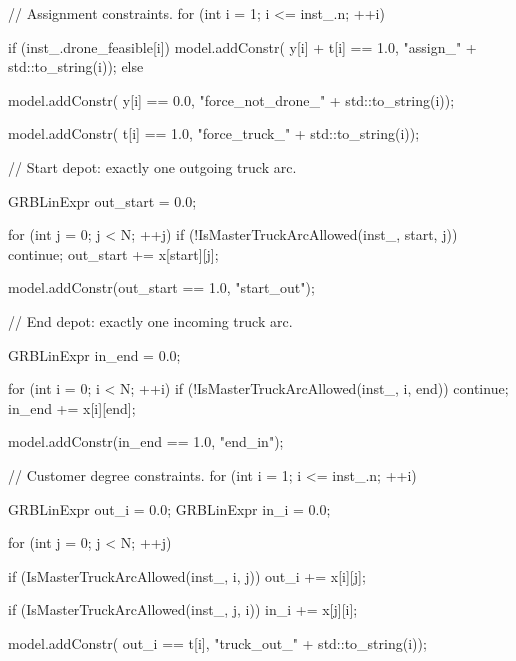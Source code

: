 {{{            // Assignment constraints.
            for (int i = 1; i <= inst_.n; ++i)
            {
                if (inst_.drone_feasible[i])
                {
                    model.addConstr(
                        y[i] + t[i] == 1.0,
                        "assign_" + std::to_string(i));
                }
                else
                {
                    model.addConstr(
                        y[i] == 0.0,
                        "force_not_drone_" + std::to_string(i));

                    model.addConstr(
                        t[i] == 1.0,
                        "force_truck_" + std::to_string(i));
                }
            }

            // Start depot: exactly one outgoing truck arc.
            {
                GRBLinExpr out_start = 0.0;

                for (int j = 0; j < N; ++j)
                {
                    if (!IsMasterTruckArcAllowed(inst_, start, j))
                        continue;
                    out_start += x[start][j];
                }

                model.addConstr(out_start == 1.0, "start_out");
            }

            // End depot: exactly one incoming truck arc.
            {
                GRBLinExpr in_end = 0.0;

                for (int i = 0; i < N; ++i)
                {
                    if (!IsMasterTruckArcAllowed(inst_, i, end))
                        continue;
                    in_end += x[i][end];
                }

                model.addConstr(in_end == 1.0, "end_in");
            }

            // Customer degree constraints.
            for (int i = 1; i <= inst_.n; ++i)
            {
                GRBLinExpr out_i = 0.0;
                GRBLinExpr in_i = 0.0;

                for (int j = 0; j < N; ++j)
                {
                    if (IsMasterTruckArcAllowed(inst_, i, j))
                    {
                        out_i += x[i][j];
                    }

                    if (IsMasterTruckArcAllowed(inst_, j, i))
                    {
                        in_i += x[j][i];
                    }
                }

                model.addConstr(
                    out_i == t[i],
                    "truck_out_" + std::to_string(i));

}}}}
